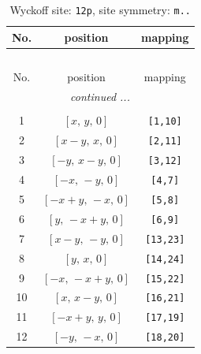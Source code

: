 \documentclass[fleqn,8pt]{jsarticle}
\begin{document}
\begin{longtable}{ccc}
\caption{Wyckoff site: {\tt 12p}, site symmetry: {\tt m..}}
 \\
 \hline \hline
No. & position & mapping \\ \hline \endfirsthead

\multicolumn{2}{l}{\tablename\ \thetable{}} \\
 \hline \hline
No. & position & mapping \\ \hline \endhead

 \hline \hline
\multicolumn{2}{r}{\footnotesize\it continued ...} \\ \endfoot

 \hline \hline
\multicolumn{2}{r}{} \\ \endlastfoot

1 & $\left[ x,\, y,\, 0 \right]$ & {\tt [1,10]} \\ \hline
2 & $\left[ x - y,\, x,\, 0 \right]$ & {\tt [2,11]} \\ \hline
3 & $\left[ - y,\, x - y,\, 0 \right]$ & {\tt [3,12]} \\ \hline
4 & $\left[ - x,\, - y,\, 0 \right]$ & {\tt [4,7]} \\ \hline
5 & $\left[ - x + y,\, - x,\, 0 \right]$ & {\tt [5,8]} \\ \hline
6 & $\left[ y,\, - x + y,\, 0 \right]$ & {\tt [6,9]} \\ \hline
7 & $\left[ x - y,\, - y,\, 0 \right]$ & {\tt [13,23]} \\ \hline
8 & $\left[ y,\, x,\, 0 \right]$ & {\tt [14,24]} \\ \hline
9 & $\left[ - x,\, - x + y,\, 0 \right]$ & {\tt [15,22]} \\ \hline
10 & $\left[ x,\, x - y,\, 0 \right]$ & {\tt [16,21]} \\ \hline
11 & $\left[ - x + y,\, y,\, 0 \right]$ & {\tt [17,19]} \\ \hline
12 & $\left[ - y,\, - x,\, 0 \right]$ & {\tt [18,20]} \\
\end{longtable}
\renewcommand{\arraystretch}{1.2}
\end{document}
